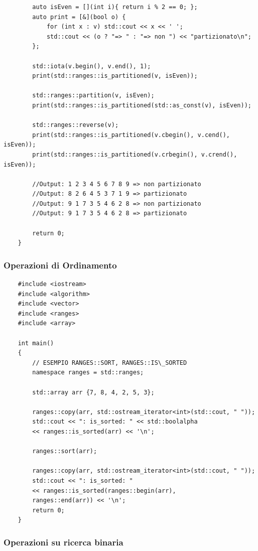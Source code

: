 \begin{lstlisting}
		auto isEven = [](int i){ return i % 2 == 0; };
		auto print = [&](bool o) {
			for (int x : v) std::cout << x << ' ';
			std::cout << (o ? "=> " : "=> non ") << "partizionato\n";
		};
		
		std::iota(v.begin(), v.end(), 1);
		print(std::ranges::is_partitioned(v, isEven));
		
		std::ranges::partition(v, isEven);
		print(std::ranges::is_partitioned(std::as_const(v), isEven));
		
		std::ranges::reverse(v);
		print(std::ranges::is_partitioned(v.cbegin(), v.cend(), isEven));
		print(std::ranges::is_partitioned(v.crbegin(), v.crend(), isEven));
		
		//Output: 1 2 3 4 5 6 7 8 9 => non partizionato
		//Output: 8 2 6 4 5 3 7 1 9 => partizionato
		//Output: 9 1 7 3 5 4 6 2 8 => non partizionato
		//Output: 9 1 7 3 5 4 6 2 8 => partizionato
		
		return 0;
	}
\end{lstlisting}

\subsubsection{Operazioni di Ordinamento}

\label{ranges_sorting}

\begin{lstlisting}
	#include <iostream>
	#include <algorithm>
	#include <vector>
	#include <ranges>
	#include <array>
	
	int main()
	{
		// ESEMPIO RANGES::SORT, RANGES::IS\_SORTED
		namespace ranges = std::ranges;
		
		std::array arr {7, 8, 4, 2, 5, 3};
		
		ranges::copy(arr, std::ostream_iterator<int>(std::cout, " "));
		std::cout << ": is_sorted: " << std::boolalpha
		<< ranges::is_sorted(arr) << '\n';
		
		ranges::sort(arr);
		
		ranges::copy(arr, std::ostream_iterator<int>(std::cout, " "));
		std::cout << ": is_sorted: "
		<< ranges::is_sorted(ranges::begin(arr), 
		ranges::end(arr)) << '\n';
		return 0;
	}
\end{lstlisting}

\subsubsection{Operazioni su ricerca binaria}

\label{ranges_binary_search}

